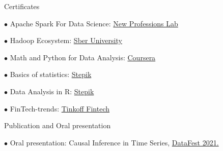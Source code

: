 \documentclass{resume} %
\begin{document}
\begin{rSection}{ Certificates }
    
    \noindent
    \begin{multicols}{2}[]
    
    $\bullet$ Apache Spark For Data Science: \href{https://drive.google.com/file/d/1evNnhppurXyzoJdDQp115oRHAtRayW5c/view?usp=sharing}{New Professions Lab} 
    
    $\bullet$ Hadoop Ecosystem: \href{https://drive.google.com/file/d/1oKQetSzr_RCyxpTdWmbY30uNEQGlxMRn/view?usp=sharing}{Sber University}
    
    $\bullet$ Math and Python for Data Analysis: \href{https://coursera.org/share/bbccb26f066e4ed7ca05c52754b15976}{Coursera} 
    
    $\bullet$ Basics of statistics: \href{https://stepik.org/cert/258802}{Stepik}

    $\bullet$ Data Analysis in R: \href{https://stepik.org/cert/744648}{Stepik}
    
    $\bullet$ FinTech-trends: \href{https://drive.google.com/file/d/1kws8qPbbTlbQyyTZY5I2eY6o37Grdccv/view?usp=sharing}{Tinkoff Fintech}
    
    \end{multicols}

\end{rSection}

\begin{rSection}{ Publication and Oral presentation }

    { $\bullet$ Oral presentation: Causal Inference in Time Series, \href{https://youtu.be/Yr6b8Rpy7Ds}{DataFest 2021. }}\\

\end{rSection}
\end{document}
